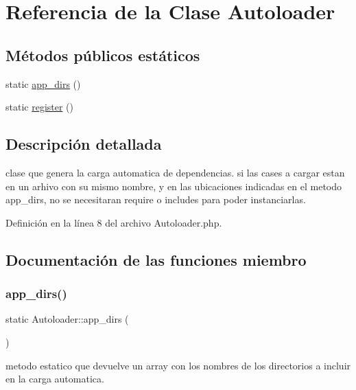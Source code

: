 \hypertarget{class_autoloader}{}\section{Referencia de la Clase Autoloader}
\label{class_autoloader}
\subsection*{Métodos públicos estáticos}
\begin{DoxyCompactItemize}
\item 
static \mbox{\hyperlink{class_autoloader_ad1af7fdc61b9d8e6607ac59019adaa41}{app\+\_\+dirs}} ()
\item 
static \mbox{\hyperlink{class_autoloader_a818817cb215d74d3c65e4855898b8902}{register}} ()
\end{DoxyCompactItemize}


\subsection{Descripción detallada}
clase que genera la carga automatica de dependencias. si las cases a cargar estan en un arhivo con su mismo nombre, y en las ubicaciones indicadas en el metodo app\+\_\+dirs, no se necesitaran require o includes para poder instanciarlas. 

Definición en la línea 8 del archivo Autoloader.\+php.



\subsection{Documentación de las funciones miembro}
\mbox{\label{class_autoloader_ad1af7fdc61b9d8e6607ac59019adaa41}} 
\subsubsection{\texorpdfstring{app\_dirs()}{app\_dirs()}}
{\footnotesize\ttfamily static Autoloader\+::app\+\_\+dirs (\begin{DoxyParamCaption}{ }\end{DoxyParamCaption})\hspace{0.3cm}{\ttfamily [static]}}

metodo estatico que devuelve un array con los nombres de los directorios a incluir en la carga automatica.

